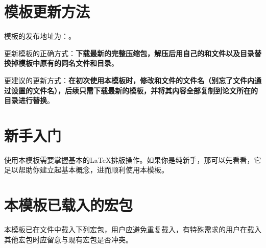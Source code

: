 \documentclass[doctor, vlined]{DissertUESTC}
\begin{document}
	\section{模板更新方法}

	模板的发布地址为：\href{https://github.com/MGG1996/DissertationUESTC}{\color{DarkRed}}。
	
	更新模板的正确方式：\textbf{下载最新的完整压缩包，解压后用自己的和文件以及目录替换掉模板中原有的同名文件和目录}。

	更建议的更新方式：\textbf{\color{DarkRed}在初次使用本模板时，修改和文件的文件名（别忘了文件内通过设置的文件名），后续只需下载最新的模板，并将其内容全部复制到论文所在的目录进行替换}。


	\section{新手入门}

	使用本模板需要掌握基本的LaTeX排版操作。如果你是纯新手，那可以先看看\href{https://ctan.math.utah.edu/ctan/tex-archive/info/lshort/chinese/lshort-zh-cn.pdf}{\bfseries\color{DarkRed}}，它足以帮助你建立起基本概念，进而顺利使用本模板。


	\section{本模板已载入的宏包}

	本模板已在文件中载入下列宏包，用户应避免重复载入，有特殊需求的用户在载入其他宏包时应留意与现有宏包是否冲突。
\end{document}
